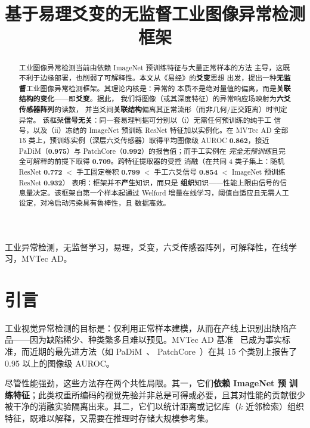 \documentclass[journal,10pt]{IEEEtran}
\title{基于易理爻变的无监督工业图像异常检测框架}
\author{%
\IEEEauthorblockN{马兴录，等}
\IEEEauthorblockA{青岛科技大学信息科学技术学院\\
Email: \texttt{mxl@qust.edu.cn}}}
\begin{document}
\maketitle

\begin{abstract}
工业图像异常检测当前由依赖 ImageNet 预训练特征与大量正常样本的方法
主导，这既不利于边缘部署，也削弱了可解释性。本文从《易经》的\textbf{爻变}思想
出发，提出一种\textbf{无监督}工业图像异常检测框架。其理论内核是：异常的
本质不是绝对量值的偏离，而是\textbf{关联结构的变化}——即\textbf{爻变}。据此，
我们将图像（或其深度特征）的异常响应场映射为\textbf{六爻传感器阵列}的读数，
并当爻间\textbf{关联结构}偏离其正常流形（而非几何/正交距离）时判定异常。
该框架\textbf{信号无关}：同一套易理判据可分别以（i）无需任何预训练的纯手工
信号，以及（ii）冻结的 ImageNet 预训练 ResNet 特征加以实例化。在 MVTec AD 全部
15 类上，预训练实例（深层六爻传感器）取得平均图像级 AUROC \textbf{0.862}，接近
PaDiM（\textbf{0.975}）与 PatchCore（\textbf{0.992}）的报告值；而手工实例在
\emph{完全无预训练}且完全可解释的前提下取得 \textbf{0.709}。跨特征提取器的受控
消融（在共同 4 类子集上：随机 ResNet \textbf{0.772} $<$ 手工固定卷积
\textbf{0.799} $<$ 手工六爻信号 \textbf{0.854} $<$ ImageNet 预训练 ResNet \textbf{0.932}）
表明：框架并不\textbf{产生}知识，而只是
\textbf{组织}知识——性能上限由信号的信息量决定。该框架自第一个样本起通过
Welford 增量在线学习，阈值自适应且无需人工设定，对冷启动污染具有鲁棒性，且
数据高效。
\end{abstract}

\begin{IEEEkeywords}
工业异常检测，无监督学习，易理，爻变，六爻传感器阵列，可解释性，在线学习，MVTec AD。
\end{IEEEkeywords}

\section{引言}
工业视觉异常检测的目标是：仅利用正常样本建模，从而在产线上识别出缺陷产
品——因为缺陷稀少、种类繁多且难以预见。MVTec AD 基准~\cite{bergmann2019mvtec}
已成为事实标准，而近期的最先进方法（如 PaDiM~\cite{defard2021padim}、
PatchCore~\cite{roth2022patchcore}）在其 15 个类别上报告了 0.95 以上的图像级
AUROC。

尽管性能强劲，这些方法存在两个共性局限。其一，它们\textbf{依赖 ImageNet 预
训练特征}；此类权重所编码的视觉先验并非总是可得或必要，且其对性能的贡献很少
被干净的消融实验隔离出来。其二，它们以统计距离或记忆库（$k$ 近邻检索）组织
特征，既难以解释，又需要在推理时存储大规模参考集。
\end{document}

